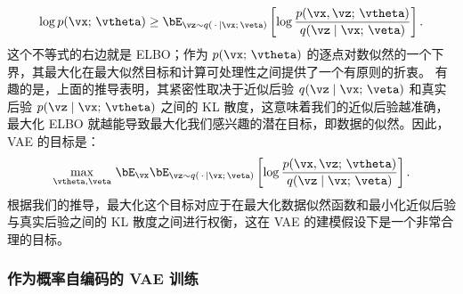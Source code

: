 \documentclass[../../book-main.tex]{subfiles}
\begin{document}
\begin{equation*}
\log p(\vx;\, \vtheta)
\geq
\bE_{\vz \sim q(\,\cdot\, \mid \vx ;\, \veta)} \left[
  \log \frac{p(\vx, \vz;\, \vtheta)}{q(\vz \mid \vx;\, \veta)}
\right].
\end{equation*}
这个不等式的右边就是 ELBO；作为 $p(\vx;\, \vtheta)$ 的逐点对数似然的一个下界，其最大化在最大似然目标和计算可处理性之间提供了一个有原则的折衷。
有趣的是，上面的推导表明，其紧密性取决于近似后验 $q(\vz \mid \vx;\, \veta)$ 和真实后验 $p(\vz \mid \vx;\, \vtheta)$ 之间的 KL 散度，这意味着我们的近似后验越准确，最大化 ELBO 就越能导致最大化我们感兴趣的潜在目标，即数据的似然。因此，VAE 的目标是：
\begin{equation}\label{eq:elbo-objective}
\max_{\vtheta, \veta}\,
\bE_{\vx}
\bE_{\vz \sim q(\,\cdot\, \mid \vx ;\, \veta)} \left[
  \log \frac{p(\vx, \vz;\, \vtheta)}{q(\vz \mid \vx;\, \veta)}
\right].
\end{equation}
根据我们的推导，最大化这个目标对应于在最大化数据似然函数和最小化近似后验与真实后验之间的 KL 散度之间进行权衡，这在 VAE 的建模假设下是一个非常合理的目标。

\subsubsection{作为概率自编码的 VAE 训练}
\end{document}
